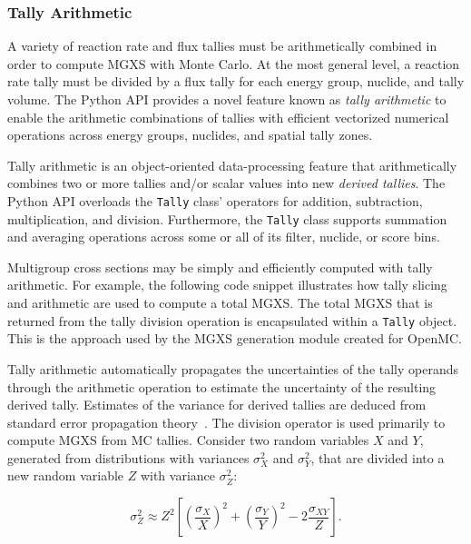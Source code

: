 \subsubsection{Tally Arithmetic}
\label{subsubsec:tally-arithmetic}

A variety of reaction rate and flux tallies must be arithmetically combined in order to compute MGXS with Monte Carlo. At the most general level, a reaction rate tally must be divided by a flux tally for each energy group, nuclide, and tally volume. The Python API provides a novel feature known as \emph{tally arithmetic} to enable the arithmetic combinations of tallies with efficient vectorized numerical operations across energy groups, nuclides, and spatial tally zones.

Tally arithmetic is an object-oriented data-processing feature that arithmetically combines two or more tallies and/or scalar values into new \emph{derived tallies}. The Python API overloads the \texttt{Tally} class' operators for addition, subtraction, multiplication, and division. Furthermore, the \texttt{Tally} class supports summation and averaging operations across some or all of its filter, nuclide, or score bins.

Multigroup cross sections may be simply and efficiently computed with tally arithmetic. For example, the following code snippet illustrates how tally slicing and arithmetic are used to compute a total MGXS. The total MGXS that is returned from the tally division operation is encapsulated within a \texttt{Tally} object. This is the approach used by the MGXS generation module created for OpenMC.



Tally arithmetic automatically propagates the uncertainties of the tally operands through the arithmetic operation to estimate the uncertainty of the resulting derived tally. Estimates of the variance for derived tallies are deduced from standard error propagation theory~\cite{bevington2003data}. The division operator is used primarily to compute MGXS from MC tallies. Consider two random variables $X$ and $Y$, generated from distributions with variances $\sigma_{X}^2$ and $\sigma_{Y}^2$, that are divided into a new random variable $Z$ with variance $\sigma_{Z}^2$:

\begin{equation}
\label{eqn:div-prop}
\sigma_{Z}^{2} \approx Z^{2}\left[\left(\frac{\sigma_{X}}{X}\right)^{2} + \left(\frac{\sigma_{Y}}{Y}\right)^{2} - 2\frac{\sigma_{XY}}{Z}\right].
\end{equation}

